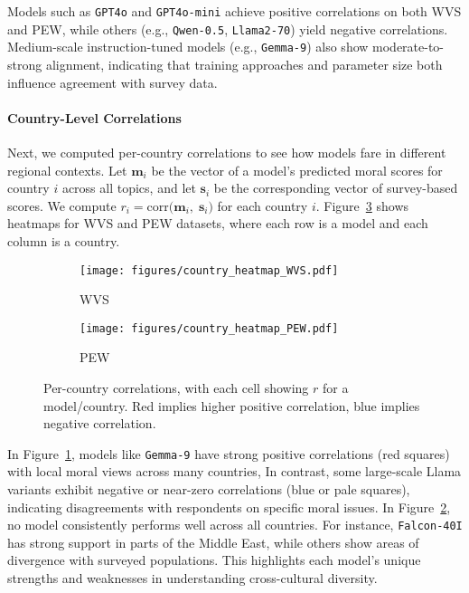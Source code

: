 \documentclass[11pt]{article}
\begin{document}
Models such as \texttt{GPT4o} and \texttt{GPT4o-mini} achieve positive correlations on both WVS and PEW, while others (e.g., \texttt{Qwen-0.5}, \texttt{Llama2-70}) yield negative correlations. Medium-scale instruction-tuned models (e.g., \texttt{Gemma-9}) also show moderate-to-strong alignment, indicating that training approaches and parameter size both influence agreement with survey data.

\paragraph{Country-Level Correlations} Next, we computed per-country correlations to see how models fare in different regional contexts. Let \(\mathbf{m}_i\) be the vector of a model’s predicted moral scores for country \(i\) across all topics, and let \(\mathbf{s}_i\) be the corresponding vector of survey-based scores. We compute $r_i = \mathrm{corr}\bigl(\mathbf{m}_i,\;\mathbf{s}_i\bigr)$ for each country \(i\). Figure~\ref{fig:country_heatmaps} shows heatmaps for WVS and PEW datasets, where each row is a model and each column is a country.


\begin{figure}[H]
    \centering
    \begin{subfigure}{0.5\textwidth}
        \centering
        \texttt{[image: figures/country\_heatmap\_WVS.pdf]}
        \caption{\small WVS}
        \label{fig:country_heatmap_wvs}
    \end{subfigure}
    \begin{subfigure}{0.5\textwidth}
        \centering
        \texttt{[image: figures/country\_heatmap\_PEW.pdf]}
        \caption{\small PEW}
        \label{fig:country_heatmap_pew}
    \end{subfigure}
    \vspace{-15pt}
    \caption{\small Per-country correlations, with each cell showing $r$ for a model/country. Red implies higher positive correlation, blue implies negative correlation.}
    \label{fig:country_heatmaps}
\end{figure}

\vspace{-10pt}
In Figure~\ref{fig:country_heatmap_wvs}, models like \texttt{Gemma-9} have strong positive correlations (red squares) with local moral views across many countries, In contrast, some large-scale Llama variants exhibit negative or near-zero correlations (blue or pale squares), indicating disagreements with respondents on specific moral issues. In Figure~\ref{fig:country_heatmap_pew}, no model consistently performs well across all countries. For instance, \texttt{Falcon-40I} has strong support in parts of the Middle East, while others show areas of divergence with surveyed populations. This highlights each model's unique strengths and weaknesses in understanding cross-cultural diversity.
\end{document}
